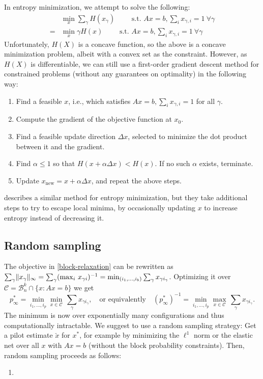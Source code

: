 \documentclass{article} %
\begin{document}
In entropy minimization, we attempt to solve the following:
\begin{align*}
&  \min_{x} \sum_\gamma H(x_\gamma) \qquad \text{ s.t. } Ax = b, \sum_i x_{\gamma, i} = 1\ \forall \gamma \\
=& \min_{x} \gamma H(x) \qquad \text{ s.t. } Ax = b, \sum_i x_{\gamma, i} = 1\ \forall \gamma
\end{align*}
Unfortunately, $H(X)$ is a concave function, so the above is a concave minimization problem, albeit with a convex set as the constraint.
However, as $H(X)$ is differentiable, we can still use a first-order gradient descent method for constrained problems (without any guarantees on optimality) in the following way:
\begin{enumerate}
  \item Find a feasible $x$, i.e., which satisfies $Ax = b, \sum_i x_{\gamma, i} = 1$ for all $\gamma$.
  \item Compute the gradient of the objective function at $x_0$.
  \item Find a feasible update direction $\Delta x$, selected to minimize the dot product between it and the gradient.
  \item Find $\alpha \le 1$ so that $H(x + \alpha \Delta x) < H(x)$. If no such $\alpha$ exists, terminate.
  \item Update $x_\textrm{new} = x + \alpha \Delta x$, and repeat the above steps.
\end{enumerate}
\cite{sudoku} describes a similar method for entropy minimization, but they take additional steps to try to escape local minima, by occasionally updating $x$ to increase entropy instead of decreasing it.

\subsection{Random sampling}
The objective in \eqref{block-relaxation} can be rewritten as
$\sum_\gamma \lVert x_\gamma\rVert_\infty = \sum_\gamma (\max_i\,x_{\gamma
  i})^{-1} = \min_{(i_1, \dots, i_b)} \sum_\gamma x_{\gamma i_\gamma}$.
Optimizing it over $\mathcal C = \mathcal B_n^k \cap \{x : Ax =
b\}$ we get
\begin{equation*}
  p_\infty^* = \min_{i_1, \dots, i_p} \min_{x\in \mathcal C}\,
  {\textstyle \sum_\gamma x_{\gamma i_\gamma}},\quad
  \text{or equivalently}\quad
  (p_\infty^*)^{-1} = \min_{i_1, \dots, i_p} \max_{x\in \mathcal C} \,
  {\textstyle \sum_\gamma x_{\gamma i_\gamma}}.
\end{equation*}
The minimum is now over exponentially many configurations and thus
computationally intractable. We suggest to use a random sampling
strategy: Get a pilot estimate $\check x$ for $x^*$, for example by
minimizing the $\ell^1$ norm or the elastic net over all $x$ with $Ax
= b$ (without the block probability constraints). Then, random
sampling proceeds as follows:
\begin{enumerate}
  \item 
\end{enumerate}
\end{document}
